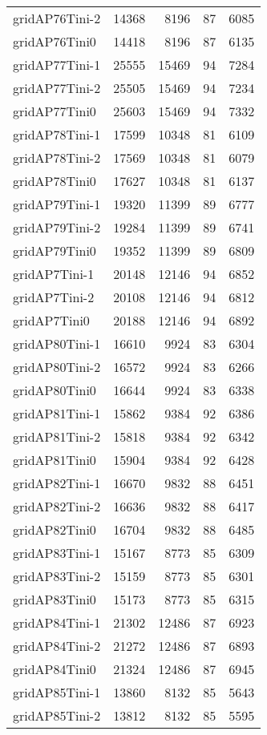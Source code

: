 \begin{longtable}{lrrrr}
gridAP76Tini-2 & 14368 & 8196 & 87 & 6085 \\
gridAP76Tini0 & 14418 & 8196 & 87 & 6135 \\
gridAP77Tini-1 & 25555 & 15469 & 94 & 7284 \\
gridAP77Tini-2 & 25505 & 15469 & 94 & 7234 \\
gridAP77Tini0 & 25603 & 15469 & 94 & 7332 \\
gridAP78Tini-1 & 17599 & 10348 & 81 & 6109 \\
gridAP78Tini-2 & 17569 & 10348 & 81 & 6079 \\
gridAP78Tini0 & 17627 & 10348 & 81 & 6137 \\
gridAP79Tini-1 & 19320 & 11399 & 89 & 6777 \\
gridAP79Tini-2 & 19284 & 11399 & 89 & 6741 \\
gridAP79Tini0 & 19352 & 11399 & 89 & 6809 \\
gridAP7Tini-1 & 20148 & 12146 & 94 & 6852 \\
gridAP7Tini-2 & 20108 & 12146 & 94 & 6812 \\
gridAP7Tini0 & 20188 & 12146 & 94 & 6892 \\
gridAP80Tini-1 & 16610 & 9924 & 83 & 6304 \\
gridAP80Tini-2 & 16572 & 9924 & 83 & 6266 \\
gridAP80Tini0 & 16644 & 9924 & 83 & 6338 \\
gridAP81Tini-1 & 15862 & 9384 & 92 & 6386 \\
gridAP81Tini-2 & 15818 & 9384 & 92 & 6342 \\
gridAP81Tini0 & 15904 & 9384 & 92 & 6428 \\
gridAP82Tini-1 & 16670 & 9832 & 88 & 6451 \\
gridAP82Tini-2 & 16636 & 9832 & 88 & 6417 \\
gridAP82Tini0 & 16704 & 9832 & 88 & 6485 \\
gridAP83Tini-1 & 15167 & 8773 & 85 & 6309 \\
gridAP83Tini-2 & 15159 & 8773 & 85 & 6301 \\
gridAP83Tini0 & 15173 & 8773 & 85 & 6315 \\
gridAP84Tini-1 & 21302 & 12486 & 87 & 6923 \\
gridAP84Tini-2 & 21272 & 12486 & 87 & 6893 \\
gridAP84Tini0 & 21324 & 12486 & 87 & 6945 \\
gridAP85Tini-1 & 13860 & 8132 & 85 & 5643 \\
gridAP85Tini-2 & 13812 & 8132 & 85 & 5595 \\

\end{longtable}
